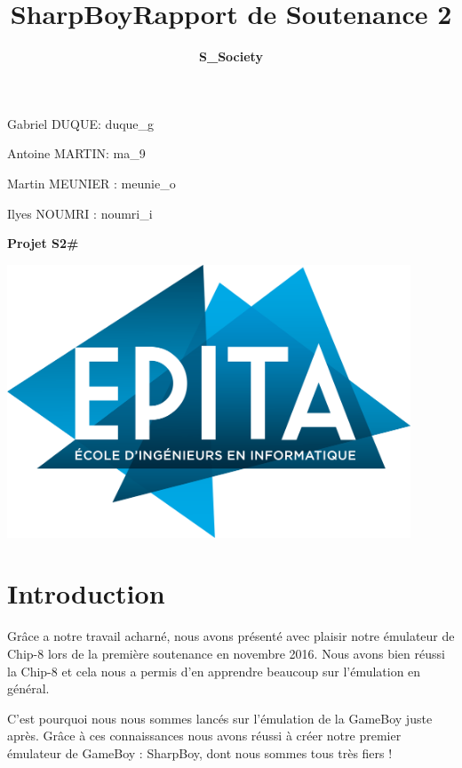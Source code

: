\documentclass[12pt, a4paper]{article}
\title{\Huge \bf SharpBoy}
\author{\LARGE \bf S\_Society }
\title{\Large \bf Rapport de Soutenance 2}
\begin{document}
\maketitle


\bigskip
\large Gabriel DUQUE: duque\_g

\bigskip
\large Antoine MARTIN: ma\_9

\bigskip
\large Martin MEUNIER : meunie\_o

\bigskip
\large Ilyes NOUMRI : noumri\_i

\bigskip
\large {\textbf{Projet S2\#}}

\bigskip 
\bigskip
\bigskip



\begin{center}
\includegraphics[width= 12cm]{logo-epita-hd.png} 
\end{center}


\pagebreak

\tableofcontents 

\pagebreak

\lstset{language=Caml}

\large
\section{Introduction}
Grâce a notre travail acharné, nous avons présenté avec plaisir notre émulateur de Chip-8 lors de la première soutenance en novembre 2016. Nous avons bien réussi la Chip-8 et cela nous a permis d'en apprendre beaucoup sur l'émulation en général.

C'est pourquoi nous nous sommes lancés sur l'émulation de la GameBoy juste après. Grâce à ces connaissances nous avons réussi à créer notre premier émulateur de GameBoy : SharpBoy, dont nous sommes tous très fiers !
\end{document}
